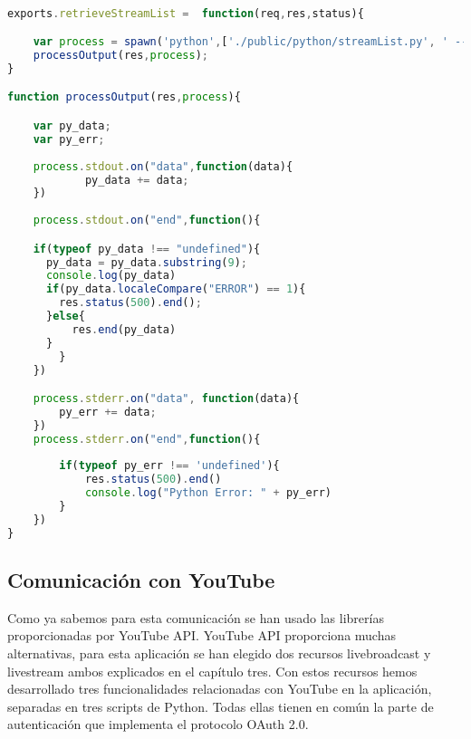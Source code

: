 \begin{lstlisting}[language = JavaScript] 

exports.retrieveStreamList =  function(req,res,status){

	var process = spawn('python',['./public/python/streamList.py', ' --status' , status]);
	processOutput(res,process);
}

function processOutput(res,process){

	var py_data;
	var py_err;
	
	process.stdout.on("data",function(data){
  			py_data += data; 
	})
	
	process.stdout.on("end",function(){

	if(typeof py_data !== "undefined"){
      py_data = py_data.substring(9);
      console.log(py_data)
      if(py_data.localeCompare("ERROR") == 1){
        res.status(500).end();
      }else{
  	 	  res.end(py_data)
      }
		}	
	})

	process.stderr.on("data", function(data){
  		py_err += data;
	})
	process.stderr.on("end",function(){
    
		if(typeof py_err !== 'undefined'){
			res.status(500).end()
  			console.log("Python Error: " + py_err)
		}	
	})
}

\end{lstlisting}

\subsection{Comunicación con YouTube}

Como ya sabemos para esta comunicación se han usado las librerías proporcionadas por YouTube API. YouTube API proporciona muchas alternativas, para esta aplicación se han elegido dos recursos livebroadcast y livestream ambos explicados en el capítulo tres. Con estos recursos hemos desarrollado tres funcionalidades relacionadas con YouTube en la aplicación, separadas en tres scripts de Python. Todas ellas tienen en común la parte de autenticación que implementa  el protocolo OAuth 2.0.

\\

